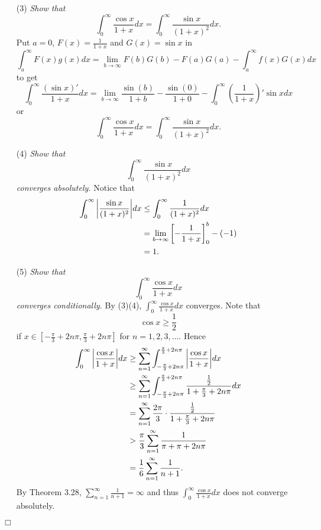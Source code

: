 \documentclass{article}
\begin{document}
\begin{enumerate}
\item[(3)]
\emph{Show that}
\[
  \int_{0}^{\infty} \frac{\cos x}{1+x} dx
  = \int_{0}^{\infty} \frac{\sin x}{(1+x)^2} dx.
\]
Put $a = 0$, $F(x) = \frac{1}{1+x}$ and $G(x) = \sin x$ in
\[
  \int_{a}^{\infty} F(x)g(x) dx
  = \lim_{b \to \infty}F(b)G(b) - F(a)G(a)
  - \int_{a}^{\infty} f(x)G(x) dx
\]
to get
\[
  \int_{0}^{\infty} \frac{(\sin x)'}{1+x} dx
  = \lim_{b \to \infty}\frac{\sin(b)}{1+b} - \frac{\sin(0)}{1+0}
  - \int_{0}^{\infty} \left(\frac{1}{1+x}\right)' \sin x dx
\]
or
\[
  \int_{0}^{\infty} \frac{\cos x}{1+x} dx
  = \int_{0}^{\infty} \frac{\sin x}{(1+x)^2} dx.
\]

\item[(4)]
\emph{Show that
\[
  \int_{0}^{\infty} \frac{\sin x}{(1+x)^2} dx
\]
converges absolutely.}
Notice that
\begin{align*}
  \int_{0}^{\infty} \abs{\frac{\sin x}{(1+x)^2}} dx
  &\leq \int_{0}^{\infty} \frac{1}{(1+x)^2} dx \\
  &= \lim_{b \to \infty} \left[ -\frac{1}{1+x} \right]_{0}^{b} - (-1) \\
  &= 1.
\end{align*}

\item[(5)]
\emph{Show that
\[
  \int_{0}^{\infty} \frac{\cos x}{1+x} dx
\]
converges conditionally.}
By (3)(4), $\int_{0}^{\infty} \frac{\cos x}{1+x} dx$ converges.
Note that
\[
  \cos x \geq \frac{1}{2}
\]
if $x \in [-\frac{\pi}{3} + 2n\pi, \frac{\pi}{3} + 2n\pi]$ for $n = 1,2,3,\ldots$.
Hence
\begin{align*}
  \int_{0}^{\infty} \abs{\frac{\cos x}{1+x}} dx
  &\geq
  \sum_{n=1}^{\infty} \int_{-\frac{\pi}{3} + 2n\pi}^{\frac{\pi}{3} + 2n\pi}
    \abs{\frac{\cos x}{1+x}} dx \\
  &\geq
  \sum_{n=1}^{\infty} \int_{-\frac{\pi}{3} + 2n\pi}^{\frac{\pi}{3} + 2n\pi}
    \frac{\frac{1}{2}}{1+\frac{\pi}{3} + 2n\pi} dx \\
  &=
  \sum_{n=1}^{\infty} \frac{2\pi}{3} \cdot \frac{\frac{1}{2}}{1+\frac{\pi}{3} + 2n\pi} \\
  &>
  \frac{\pi}{3}
    \sum_{n=1}^{\infty} \frac{1}{\pi + \pi + 2n\pi} \\
  &=
  \frac{1}{6} \sum_{n=1}^{\infty} \frac{1}{n+1}.
\end{align*}
By Theorem 3.28, $\sum_{n=1}^{\infty} \frac{1}{n+1} = \infty$
and thus $\int_{0}^{\infty} \frac{\cos x}{1+x} dx$ does not converge absolutely.
\end{enumerate}
$\Box$ \\\\
\end{document}
